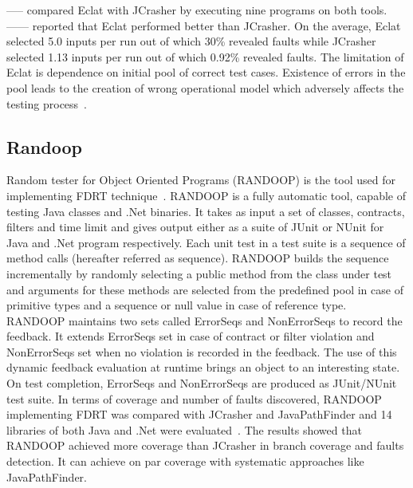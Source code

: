 ----- compared Eclat with JCrasher by executing nine programs on  both tools. ------ reported that Eclat performed better than JCrasher. On the average, Eclat selected 5.0 inputs per run out of which 30\% revealed faults while JCrasher selected 1.13 inputs per run out of which 0.92\% revealed faults. The limitation of Eclat is dependence on initial pool of correct test cases. Existence of errors in the pool leads to the creation of wrong operational model which adversely affects the testing process~\cite{Pacheco2007b}.   



\subsection{Randoop}
Random tester for Object Oriented Programs (RANDOOP) is the tool used for implementing FDRT technique~\cite{Pacheco2007b}. RANDOOP is a fully automatic tool, capable of testing Java classes and .Net binaries. It takes as input a set of classes, contracts, filters and time limit and gives output either as a suite of JUnit or NUnit for Java and .Net program respectively. Each unit test in a test suite is a sequence of method calls (hereafter referred as sequence). RANDOOP builds the sequence incrementally by randomly selecting a public method from the class under test and arguments for these methods are selected from the predefined pool in case of primitive types and a sequence or null value in case of reference type. RANDOOP maintains two sets called ErrorSeqs and NonErrorSeqs to record the feedback. It extends ErrorSeqs set in case of contract or filter violation and NonErrorSeqs set when no violation is recorded in the feedback. The use of this dynamic feedback evaluation at runtime brings an object to an interesting state. On test completion, ErrorSeqs and NonErrorSeqs are produced as JUnit/NUnit test suite. In terms of coverage and number of faults discovered, RANDOOP implementing FDRT was compared with JCrasher and JavaPathFinder and 14 libraries of both Java and .Net were evaluated~\cite{visser2004test}. The results showed that RANDOOP achieved more coverage than JCrasher in branch coverage and faults detection. It can achieve on par coverage with systematic approaches like JavaPathFinder. 

